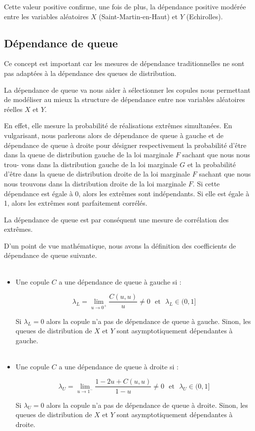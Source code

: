 \begin{center}
\end{center}

Cette valeur positive confirme, une fois de plus, la dépendance positive modérée entre les variables aléatoires $X$ (Saint-Martin-en-Haut) et $Y$ (Echirolles).



\subsection{Dépendance de queue}

Ce concept est important car les mesures de dépendance traditionnelles ne sont pas adaptées à la
dépendance des queues de distribution. 

La dépendance de queue va nous aider à sélectionner les copules nous permettant de modéliser au mieux la structure de dépendance entre nos variables 
aléatoires réelles $X$ et $Y$. 

En effet, elle mesure la probabilité de réalisations extrêmes simultanées. En vulgarisant, nous parlerons alors
de dépendance de queue à gauche et de dépendance de queue à droite pour désigner respectivement la
probabilité d'être dans la queue de distribution gauche de la loi marginale $F$ sachant que nous nous trou-
vons dans la distribution gauche de la loi marginale $G$ et la probabilité d'être dans la queue de distribution
droite de la loi marginale $F$ sachant que nous nous trouvons dans la distribution droite de la loi marginale
$F$. Si cette dépendance est égale à 0, alors les extrêmes sont indépendants. Si elle est égale à 1, alors les
extrêmes sont parfaitement corrélés. 

La dépendance de queue est par conséquent une mesure de corrélation des extrêmes.

D'un point de vue mathématique, nous avons la définition des coefficients de dépendance de queue suivante.
~\\~
\begin{itemize}
\item Une copule $C$ a une dépendance de queue à gauche si :

$$
\lambda_L = \underset{u \rightarrow 0^+}{\operatorname{lim}} \frac{C(u,u)}{u} \neq 0 \text{~~et~~} \lambda_L \in (0,1]
$$

Si $\lambda_L =0$ alors la copule n'a pas de dépendance de queue à gauche. Sinon, les queues de distribution de $X$ et $Y$ sont asymptotiquement
dépendantes à gauche.
~\\~
\item Une copule $C$ a une dépendance de queue à droite si :

$$
\lambda_U= \underset{u \rightarrow 1^-}{\operatorname{lim}} \frac{1-2u + C(u,u)}{1-u} \neq 0 \text{~~et~~} \lambda_U \in (0,1]
$$

Si $\lambda_U =0$ alors la copule n'a pas de dépendance de queue à droite. Sinon, les queues de distribution de $X$ et $Y$ sont asymptotiquement
dépendantes à droite.

\end{itemize}

